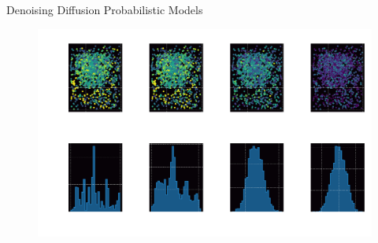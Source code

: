 \begin{frame}[c]{Denoising Diffusion Probabilistic Models}
    \begin{figure}
        \centering
        \includegraphics[height=7cm]{script/images/ddpm_diffusion_z.pdf}
    \end{figure}
\end{frame}


